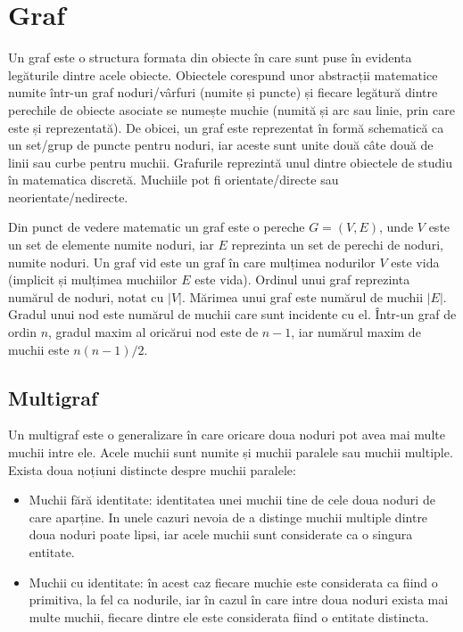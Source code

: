 \newpage
\section{Graf}
Un graf este o structura formata din obiecte în care sunt puse în evidenta legăturile dintre acele obiecte. 
Obiectele corespund unor abstracții matematice numite într-un graf noduri/vârfuri (numite și puncte) și fiecare legătură 
dintre perechile de obiecte asociate se numește muchie (numită și arc sau linie, prin care este și reprezentată). 
De obicei, un graf este reprezentat în formă schematică ca un set/grup de puncte pentru noduri, iar aceste sunt unite două 
câte două de linii sau curbe pentru muchii. Grafurile reprezintă unul dintre obiectele de studiu în matematica discretă. 
Muchiile pot fi orientate/directe sau neorientate/nedirecte.\newline

Din punct de vedere matematic un graf este o pereche \(G=(V,E)\), unde \(V\) este un set de elemente numite noduri, iar \(E\) reprezinta un set de perechi de noduri, numite noduri.
Un graf vid este un graf în care mulțimea nodurilor \(V\) este vida (implicit și mulțimea muchiilor \(E\) este vida).
Ordinul unui graf reprezinta numărul de noduri, notat cu \(|V|\). Mărimea unui graf este numărul de muchii \(|E|\).
Gradul unui nod este numărul de muchii care sunt incidente cu el.
Într-un graf de ordin \(n\), gradul maxim al oricărui nod este de \(n-1\), iar numărul maxim de muchii este \(n(n-1)/2\).

\subsection{Multigraf}

Un multigraf este o generalizare în care oricare doua noduri pot avea mai multe muchii intre ele. Acele muchii sunt numite și muchii paralele sau muchii multiple.
Exista doua noțiuni distincte despre muchii paralele:\newline

\begin{itemize}
\item Muchii fără identitate: identitatea unei muchii tine de cele doua noduri de care aparține. 
In unele cazuri nevoia de a distinge muchii multiple dintre doua noduri poate lipsi, iar acele muchii sunt considerate ca o 
singura entitate.\newline
\item Muchii cu identitate: în acest caz fiecare muchie este considerata ca fiind o primitiva, la fel ca nodurile, 
iar în cazul în care intre doua noduri exista mai multe muchii, fiecare dintre ele este considerata fiind o entitate distincta.\newline
\end{itemize}

